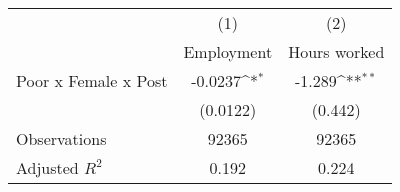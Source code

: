 {
\def\sym#1{\ifmmode^{#1}\else\(^{#1}\)\fi}
\begin{tabular}{l*{2}{c}}
\hline\hline
                &\multicolumn{1}{c}{(1)}&\multicolumn{1}{c}{(2)}\\
                &\multicolumn{1}{c}{Employment}&\multicolumn{1}{c}{Hours worked}\\
\hline
Poor x Female x Post&  -0.0237\sym{*}  &   -1.289\sym{**} \\
                & (0.0122)         &  (0.442)         \\
\hline
Observations    &    92365         &    92365         \\
Adjusted \(R^{2}\)&    0.192         &    0.224         \\
\hline\hline
\end{tabular}
}
